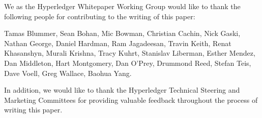 We as the Hyperledger Whitepaper Working Group would like to thank the following people for contributing to the writing of this paper:

Tamas Blummer, Sean Bohan, Mic Bowman, Christian Cachin, Nick Gaski, Nathan George, Daniel Hardman, Ram Jagadeesan, Travin Keith, Renat Khasanshyn, Murali Krishna, Tracy Kuhrt, Stanislav Liberman, Esther Mendez, Dan Middleton, Hart Montgomery, Dan O'Prey, Drummond Reed, Stefan Teis, Dave Voell, Greg Wallace, Baohua Yang.

In addition, we would like to thank the Hyperledger Technical Steering and Marketing Committees for providing valuable feedback throughout the process of writing this paper.
